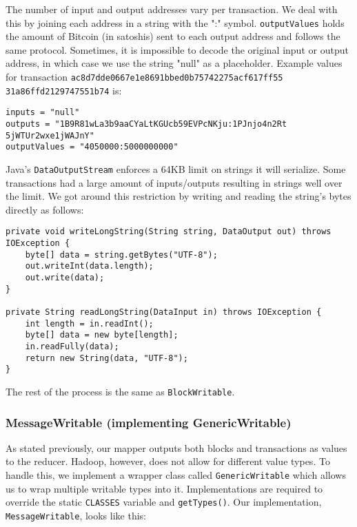 \documentclass[9pt,twocolumn,twoside]{idsi}
\begin{document}
The number of input and output addresses vary per transaction. We deal with this by joining each address in a string with the ":" symbol. \lstinline{outputValues} holds the amount of Bitcoin (in satoshis) sent to each output address and follows the same protocol. Sometimes, it is impossible to decode the original input or output address, in which case we use the string "null" as a placeholder. Example values for transaction \lstinline{ac8d7dde0667e1e8691bbed0b75742275acf617ff55} \lstinline{31a86ffd2129747551b74} is:

\begin{lstlisting}
inputs = "null"
outputs = "1B9R81wLa3b9aaCYaLtKGUcb59EVPcNKju:1PJnjo4n2Rt
5jWTUr2wxe1jWAJnY"
outputValues = "4050000:5000000000"
\end{lstlisting}

Java's \lstinline{DataOutputStream} enforces a 64KB limit on strings it will serialize. Some transactions had a large amount of inputs/outputs resulting in strings well over the limit. We got around this restriction by writing and reading the string's bytes directly as follows:

\begin{lstlisting}
private void writeLongString(String string, DataOutput out) throws IOException {
    byte[] data = string.getBytes("UTF-8");
    out.writeInt(data.length);
    out.write(data);
}

private String readLongString(DataInput in) throws IOException {
    int length = in.readInt();
    byte[] data = new byte[length];
    in.readFully(data);
    return new String(data, "UTF-8");
}
\end{lstlisting}

The rest of the process is the same as \lstinline{BlockWritable}.

\subsubsection{MessageWritable (implementing GenericWritable)}

As stated previously, our mapper outputs both blocks and transactions as values to the reducer. Hadoop, however, does not allow for different value types. To handle this, we implement a wrapper class called \lstinline{GenericWritable} which allows us to wrap multiple writable types into it. Implementations are required to override the static \lstinline{CLASSES} variable and \lstinline{getTypes()}. Our implementation, \lstinline{MessageWritable}, looks like this:
\end{document}
